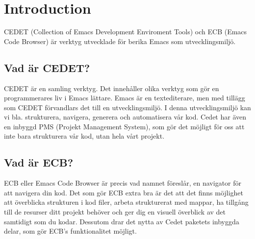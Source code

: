 \documentclass[12pt]{article} %
\begin{document}

\tableofcontents %

\newpage %


\section{Introduction} %

CEDET (Collection of Emacs Development Enviroment Tools) och ECB (Emacs Code Browser) är verktyg utvecklade för berika Emacs som utvecklingsmiljö. %


\subsection{Vad är CEDET?} %

CEDET är en samling verktyg. Det innehåller olika verktyg som gör en programmerares liv i Emacs lättare. 
Emacs är en textediterare, men med tillägg som CEDET förvandlars det till en utvecklingsmiljö.  I denna utvecklingsmiljö kan vi bla. strukturera, navigera, generera och automatisera vår kod. Cedet har även en inbyggd PMS (Projekt Management System), som gör det möjligt för oss att inte bara strukturera vår kod, utan hela vårt projekt.


\subsection{Vad är ECB?} %

ECB eller Emacs Code Browser är precis vad namnet föreslår, en navigator för att navigera din kod. Det som gör ECB extra bra är det att det finns möjlighet att överblicka strukturen i kod filer, arbeta strukturerat med mappar, ha tillgång till de resurser ditt projekt behöver och ger dig en visuell överblick av det samtidigt som du kodar. Dessutom drar det nytta av Cedet paketets inbyggda delar, som gör ECB's funktionalitet möjligt. 
\end{document}
